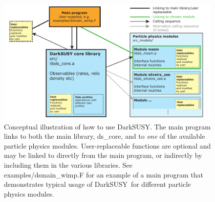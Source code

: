 \documentclass[a4paper,10pt,oneside]{book}
\newcommand{\code}[1]{\ft{#1}}
\newcommand{\ds}{{\sffamily DarkSUSY}}
\newcommand{\ft}[1]{\textsf{#1}}
\begin{document}
\begin{figure}[t!]
\centering
\includegraphics[width=\textwidth]{fig/ds6-structure-v6}
\vspace{-0.5cm}
\caption{Conceptual illustration of how to use \ds. The main program links
to both  the main library, \code{ds\_core}, and to \emph{one} of the available particle 
physics modules. User-replaceable functions are optional and may be linked to directly 
from the main program, or indirectly by including them in the various libraries. 
See \code{examples/dsmain\_wimp.F} for an example of a main program that demonstrates
typical usage of \ds\ for different particle physics modules.}
\label{fig:concept}
\end{figure}
\end{document}
